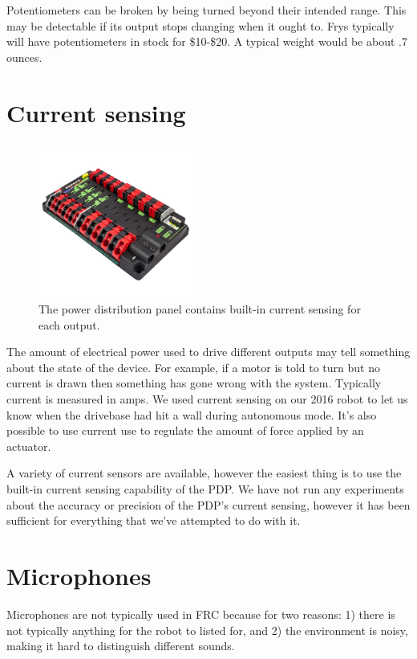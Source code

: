 \documentclass{article}
\begin{document}
Potentiometers can be broken by being turned beyond their intended range.  This may be detectable if its output stops changing when it ought to.  Frys typically will have potentiometers in stock for \$10-\$20.  A typical weight would be about .7 ounces.  

\section{Current sensing}
\begin{figure}[ht]
\centering
\includegraphics[width=2in]{pdp.jpg}
\caption{The power distribution panel contains built-in current sensing for each output.}
\end{figure}

The amount of electrical power used to drive different outputs may tell something about the state of the device.  For example, if a motor is told to turn but no current is drawn then something has gone wrong with the system.  Typically current is measured in amps.  
We used current sensing on our 2016 robot to let us know when the drivebase had hit a wall during autonomous mode.  It's also possible to use current use to regulate the amount of force applied by an actuator.  

A variety of current sensors are available, however the easiest thing is to use the built-in current sensing capability of the PDP.  We have not run any experiments about the accuracy or precision of the PDP's current sensing, however it has been sufficient for everything that we've attempted to do with it.  

\section{Microphones}
Microphones are not typically used in FRC because for two reasons: 1) there is not typically anything for the robot to listed for, and 2) the environment is noisy, making it hard to distinguish different sounds.  
\end{document}
